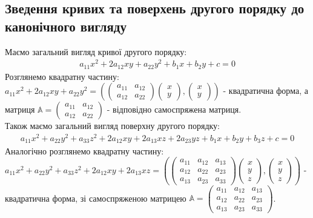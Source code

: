 \documentclass[a4paper, 10pt]{article}
\theoremstyle{theoremdd}
\begin{document}
\subsection{Зведення кривих та поверхень другого порядку до канонічного вигляду}
Маємо загальний вигляд кривої другого порядку:
\begin{align*}
a_{11}x^2 + 2a_{12}xy + a_{22}y^2 + b_1x + b_2y + c = 0
\end{align*}
Розглянемо квадратну частину:\\
$a_{11}x^2 + 2a_{12}xy + a_{22}y^2 = \left( \begin{pmatrix}
 a_{11} & a_{12} \\
 a_{12} & a_{22}
\end{pmatrix} \begin{pmatrix}
x \\ y
\end{pmatrix}, \begin{pmatrix}
x \\ y
\end{pmatrix} \right)$ - квадратична форма, а матриця $\mathbb{A} = \begin{pmatrix}
a_{11} & a_{12} \\
a_{12} & a_{22}
\end{pmatrix}$ - відповідно самоспряжена матриця.
\bigskip \\
Також маємо загальний вигляд поверхну другого порядку:
\begin{align*}
a_{11}x^2 + a_{22}y^2 + a_{33}z^2 + 2a_{12}xy + 2a_{13}xz + 2a_{23}yz + b_1x + b_2y + b_3z + c = 0
\end{align*}
Аналогічно розглянемо квадратну частину:\\
$a_{11}x^2 + a_{22}y^2 + a_{33}z^2 + 2a_{12}xy + 2a_{13}xz = \left(\begin{pmatrix}
a_{11} & a_{12} & a_{13} \\
a_{12} & a_{22} & a_{23} \\
a_{13} & a_{23} & a_{33}
\end{pmatrix} \begin{pmatrix}
x \\ y \\ z
\end{pmatrix}, \begin{pmatrix}
x \\ y \\ z
\end{pmatrix} \right)$ - квадратична форма, зі самоспряженою матрицею $\mathbb{A} = \begin{pmatrix}
a_{11} & a_{12} & a_{13} \\
a_{12} & a_{22} & a_{23} \\
a_{13} & a_{23} & a_{33}
\end{pmatrix}$.
\end{document}
